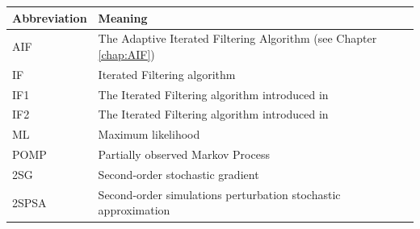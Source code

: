 \documentclass[twoside,openright]{report}
\begin{document}
\begin{table}[ht]
    \centering
    \begin{tabular}{ p{2cm}  p{8cm} }
     Abbreviation & Meaning \\ 
    \midrule
    AIF   &   The Adaptive Iterated Filtering Algorithm (see Chapter \ref{chap:AIF}) \\

    IF   &   Iterated Filtering algorithm  \\
    
    IF1   &   The Iterated Filtering algorithm introduced in \cite{ionides2011iterated} \\
    
    IF2   &   The Iterated Filtering algorithm introduced in \cite{ionides2015inference} \\
    
    ML    & Maximum likelihood \\
    
    POMP  & Partially observed Markov Process \\
    
    2SG & Second-order stochastic gradient \\

    2SPSA & Second-order simulations perturbation stochastic approximation
    
    

    \end{tabular}
    \label{tab:Abbreviations}
\end{table}
\end{document}
